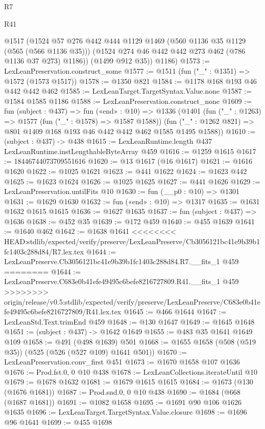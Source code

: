 \begin{lexlean}{R7}
\begin{lexlean}{R41}
\begin{coremodule}
{{{{{{{{{{{{{{{{{{{{{        @1517
        (@1524
          @57
          @276
          @442
          @444
          @1129
          @1469
          (@560 @1136 @35 @1129 (@565 (@566 @1136 @35)))
          (@1524 @274 @46 @442 @442 @273 @462 (@786 @1136 @37 @273) @1186))
        (@1499 @912 @35))
      @1186)
@1573 := LexLeanPreservation.construct_some
@1577 := @1511 (fun ("_" : @1351) => @1572 (@1573 @1517))
@1578 := @1350 @821
@1584 := @1178 @168 @193 @46 @442 @442 @462
@1585 := LexLeanTarget.TargetSyntax.Value.none
@1587 := @1584 @1585 @1186
@1588 := LexLeanPreservation.construct_none
@1609 := fun (subject : @437) =>
  fun («end» : @10) =>
  @1336
    (@1401
      (fun ("_" : @1263) => @1577 (fun ("_" : @1578) => @1587 @1588))
      (fun ("_" : @1262 @821) => @801 @1409 @168 @193 @46 @442 @442 @462 @1585 @1495 @1588))
@1610 := (subject : @437) -> @438
@1615 := LexLeanRuntime.length @437 LexLeanRuntime.instLengthableByteArray @459
@1616 := @1259 @1615
@1617 := 18446744073709551616
@1620 := @13 @1617 (@16 @1617)
@1621 := @1616 @1620
@1622 := @1025 @1621
@1623 := @441 @1622
@1624 := @1623 @442
@1625 := @1623 @1624
@1626 := @1025 @1625
@1627 := @441 @1626
@1629 := LexLeanPreservation.untilFits @10
@1630 := fun (__p0 : @10) => @1301
@1631 := @1629 @1630
@1632 := fun («end» : @10) => @1317
@1635 := @1631 @1632 @1615 @1615
@1636 := @1627 @1635
@1637 := fun (subject : @437) => @1636
@1638 := @452 @35
@1639 := @172 @459
@1640 := @455 @1639
@1641 := @1640 @462
@1642 := @1638 @1641
<<<<<<<< HEAD:stdlib/expected/verify/preserve/LexLeanPreserve/Cb3056121bc41e9b39b1fc1403c288d84/R7.lex.tex
@1644 := LexLeanPreserve.Cb3056121bc41e9b39b1fc1403c288d84.R7.__fits_1 @459
========
@1644 := LexLeanPreserve.C683e0b41efe49495c6befe8216727809.R41.__fits_1 @459
>>>>>>>> origin/release/v0.5:stdlib/expected/verify/preserve/LexLeanPreserve/C683e0b41efe49495c6befe8216727809/R41.lex.tex
@1645 := @466 @1644
@1647 := LexLeanStd.Text.trimEnd @459
@1648 := @130 @1647
@1649 := @1645 @1648
@1651 := (subject : @437) -> @1642 @1649
@1655 := @483 @35 @1641 @1649 @109
@1658 := @491 (@498 @1639) @501
@1668 := @1655 @1658 (@508 (@519 @35)) (@525 (@526 (@527 @109) @1641 @501))
@1670 := LexLeanPreservation.conv_first @451
@1673 := @1670 @1658 @107 @1636
@1676 := Prod.fst.{0, 0} @10 @438
@1678 := LexLeanCollections.iterateUntil @10
@1679 := @1678 @1632
@1681 := @1679 @1615 @1615
@1684 := @1673 (@130 (@1676 @1681))
@1687 := Prod.snd.{0, 0} @10 @438
@1690 := @1684 (@668 (@1687 @1681))
@1691 := @1082 @1658
@1695 := @1691 @90 @106 @1626 @1635
@1696 := LexLeanTarget.TargetSyntax.Value.closure
@1698 := @1696 @96 @1641
@1699 := @455 @1698
}}}}}}}}}}}}}}}}}}}}}
\end{coremodule}
\end{lexlean}
\end{lexlean}

